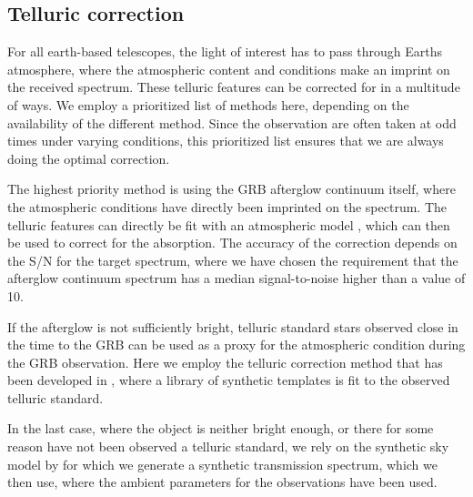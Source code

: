 \documentclass{aa}    %
\begin{document}
\subsection{Telluric correction} \label{tell_corr}

For all earth-based telescopes, the light of interest has to pass through Earths
atmosphere, where the atmospheric content and conditions make an imprint on the
received spectrum. These telluric features can be corrected for in a multitude
of ways. We employ a prioritized list of methods here, depending on the
availability of the different method. Since the observation are often taken at
odd times under varying conditions, this prioritized list ensures that we are
always doing the optimal correction.

The highest priority method is using the GRB afterglow continuum itself, where
the atmospheric conditions have directly been imprinted on the spectrum. The
telluric features can directly be fit with an atmospheric model
\citep{Smette2015, Kausch2015}, which can then be used to correct for the
absorption. The accuracy of the correction depends on the S/N for the target
spectrum, where we have chosen the requirement that the afterglow continuum
spectrum has a median signal-to-noise higher than a value of 10.

If the afterglow is not sufficiently bright, telluric standard stars observed
close in the time to the GRB can be used as a proxy for the atmospheric
condition during the GRB observation. Here we employ the telluric correction
method that has been developed in \citet{Selsing2015}, where a library of
synthetic templates is fit to the observed telluric standard.

In the last case, where the object is neither bright enough, or there for some
reason have not been observed a telluric standard, we rely on the synthetic sky
model by \citep{Noll2012, Jones2013} for which we generate a synthetic
transmission spectrum, which we then use, where the ambient parameters for the
observations have been used.
\end{document}
